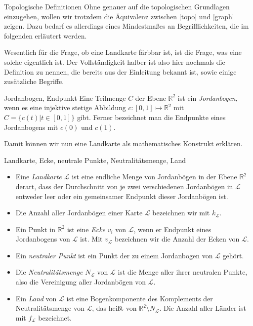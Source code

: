 \begin{section}{Topologische Definitionen}
 Ohne genauer auf die topologischen Grundlagen einzugehen, wollen wir trotzdem die Äquivalenz zwischen \ref{topo} und \ref{graph} zeigen. Dazu bedarf es allerdings eines Mindestmaßes an Begrifflichkeiten, die im folgenden erläutert werden.
 
 Wesentlich für die Frage, ob eine Landkarte färbbar ist, ist die Frage, was eine solche eigentlich ist. Der Vollständigkeit halber ist also hier nochmals die Definition zu nennen, die bereits aus der Einleitung bekannt ist, sowie einige zusätzliche Begriffe.
 
 \begin{definition}{Jordanbogen, Endpunkt}
  Eine Teilmenge $C$ der Ebene $\mathbb{R}^2$ ist ein \textit{Jordanbogen}, wenn es eine injektive stetige Abbildung $c:[0,1] \mapsto \mathbb{R}^2$ mit $C = \{c(t)|t\in [0,1]\}$ gibt. Ferner bezeichnet man die Endpunkte eines Jordanbogens mit $c(0)$ und $c(1)$.
 \end{definition}
 
 Damit können wir nun eine Landkarte als mathematisches Konstrukt erklären.
 
 \begin{definition}{Landkarte, Ecke, neutrale Punkte, Neutralitätsmenge, Land}
  \-\ 
  \begin{itemize}
    \item Eine \textit{Landkarte $\mathcal{L}$} ist eine endliche Menge von Jordanbögen in der Ebene $\mathbb{R}^2$ derart, dass der Durchschnitt von je zwei verschiedenen Jordanbögen in $\mathcal{L}$ entweder leer oder ein gemeinsamer Endpunkt dieser Jordanbögen ist.
    \item Die Anzahl aller Jordanbögen einer Karte $\mathcal{L}$ bezeichnen wir mit $k_\mathcal{L}$.
    \item Ein Punkt in $\mathbb{R}^2$ ist eine \textit{Ecke} $v_i$ von $\mathcal{L}$, wenn er Endpunkt eines Jordanbogens von $\mathcal{L}$ ist. Mit $v_\mathcal{L}$ bezeichnen wir die Anzahl der Ecken von $\mathcal{L}$.
    \item Ein \textit{neutraler Punkt} ist ein Punkt der zu einem Jordanbogen von $\mathcal{L}$ gehört.
    \item Die \textit{Neutralitätsmenge $N_{\mathcal{L}}$} von $\mathcal{L}$ ist die Menge aller ihrer neutralen Punkte, also die Vereinigung aller Jordanbögen von $\mathcal{L}$. 
    \item Ein \textit{Land} von $\mathcal{L}$ ist eine Bogenkomponente des Komplements der Neutralitätsmenge von $\mathcal{L}$, das heißt von $\mathbb{R}^2 \setminus N_{\mathcal{L}}$. Die Anzahl aller Länder ist mit $f_\mathcal{L}$ bezeichnet.
  \end{itemize}
 \end{definition}
 

\end{section}
